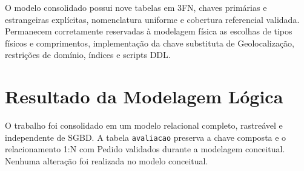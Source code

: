 \documentclass[12pt,a4paper]{article}
\begin{document}
	O modelo consolidado possui nove tabelas em 3FN, chaves primárias e estrangeiras
	explícitas, nomenclatura uniforme e cobertura referencial validada. Permanecem
	corretamente reservadas à modelagem física as escolhas de tipos físicos e comprimentos,
	implementação da chave substituta de Geolocalização, restrições de domínio,
	índices e scripts DDL.

	\section{Resultado da Modelagem Lógica}

	O trabalho foi consolidado em um modelo relacional completo, rastreável e
	independente de SGBD. A tabela \texttt{avaliacao} preserva a chave composta e
	o relacionamento 1:N com Pedido validados durante a modelagem conceitual.
	Nenhuma alteração foi realizada no modelo conceitual.
\end{document}
